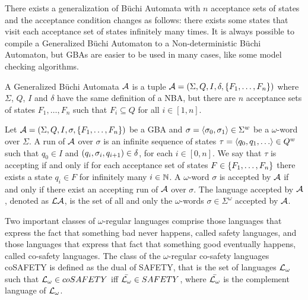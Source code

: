 There exists a generalization of B{\"u}chi Automata with $n$ acceptance sets of states and the acceptance condition changes as follows: there exists some states that visit each acceptance set of states infinitely many times. It is always possible to compile a Generalized B{\"u}chi Automaton to a Non-deterministic B{\"u}chi Automaton, but GBAs are easier to be used in many cases, like some model checking algorithms.

\begin{definition}
A Generalized B{\"u}chi Automata $\mathcal{A}$ is a tuple $\mathcal{A} = \left( \Sigma,Q,I,\delta,\{ F_1,\dots,F_n \} \right)$ where $\Sigma$, $Q$, $I$ and $\delta$ have the same definition of a NBA, but there are $n$ acceptance sets of states $F_1,\dots,F_n$ such that $F_i \subseteq Q$ for all $i \in [1,n]$.
\end{definition}

\begin{definition}
Let $\mathcal{A} = \left( \Sigma,Q,I,\sigma,\{ F_1,\dots,F_n \} \right)$ be a GBA and $\sigma = \left\langle \sigma_0,\sigma_1 \right\rangle \in \Sigma^{w}$ be a $\omega$-word over $\Sigma$.
A run of $\mathcal{A}$ over $\sigma$ is an infinite sequence of states $\tau = \sequence{q_0,q_1,\dots} \in Q^w$ such that $q_0 \in I$ and $\left( q_i,\sigma_i,q_{i+1} \right) \in \delta$, for each $i \in [0,n]$.
We say that $\tau$ is accepting if and only if for each acceptance set of states $F \in \{ F_1,\dots,F_n \}$ there exists a state $q_i \in F$ for infinitely many $i \in \mathbb{N}$.
A $\omega$-word $\sigma$ is accepted by $\mathcal{A}$ if and only if there exist an accepting run of $\mathcal{A}$ over $\sigma$. 
The language accepted by $\mathcal{A}$, denoted as $\mathcal{L}{\mathcal{A}}$, is the set of all and only the $\omega$-words $\sigma \in \Sigma^\omega$ accepted by $\mathcal{A}$.
\end{definition}

Two important classes of $\omega$-regular languages comprise those languages that express the fact that something bad never happens, called safety languages, and those languages that express that fact that something good eventually happens, called co-safety languages.
The class of the $\omega$-regular co-safety languages coSAFETY is defined as the dual of SAFETY, that is the set of languages $\mathcal{L}{}_\omega{}$ such that $\mathcal{L}{}_\omega{} \in coSAFETY$ iff $\bar{\mathcal{L}{}_\omega{}} \in SAFETY$, where $\bar{\mathcal{L}{}_\omega{}}$ is the complement language of $\mathcal{L}{}_\omega{}$.

